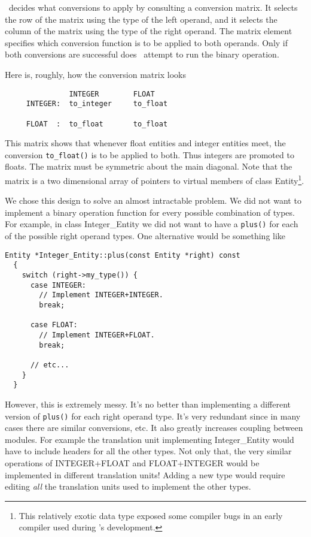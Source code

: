 \documentclass{report}
\begin{document}
\CLAC\ decides what conversions to apply by consulting a conversion matrix. It selects the row
of the matrix using the type of the left operand, and it selects the column of the matrix using
the type of the right operand. The matrix element specifies which conversion function is to be
applied to both operands. Only if both conversions are successful does \CLAC\ attempt to run the
binary operation.

Here is, roughly, how the conversion matrix looks

%
%
\begin{verbatim}
               INTEGER        FLOAT
     INTEGER:  to_integer     to_float

     FLOAT  :  to_float       to_float
\end{verbatim}

This matrix shows that whenever float entities and integer entities meet, the conversion
\texttt{to\_float()} is to be applied to both. Thus integers are promoted to floats. The matrix
must be symmetric about the main diagonal. Note that the matrix is a two dimensional array of
pointers to virtual members of class Entity\footnote{This relatively exotic data type exposed
  some compiler bugs in an early compiler used during \CLAC's development.}.

We chose this design to solve an almost intractable problem. We did not want to implement a
binary operation function for every possible combination of types. For example, in class
Integer\_Entity we did not want to have a \texttt{plus()} for each of the possible right operand
types. One alternative would be something like

\begin{verbatim}
Entity *Integer_Entity::plus(const Entity *right) const
  {
    switch (right->my_type()) {
      case INTEGER:
        // Implement INTEGER+INTEGER.
        break;

      case FLOAT:
        // Implement INTEGER+FLOAT.
        break;

      // etc...
    }
  }
\end{verbatim}

However, this is extremely messy. It's no better than implementing a different version of
\texttt{plus()} for each right operand type. It's very redundant since in many cases there are
similar conversions, etc. It also greatly increases coupling between modules. For example the
translation unit implementing Integer\_Entity would have to include headers for all the other
types. Not only that, the very similar operations of INTEGER+FLOAT and FLOAT+INTEGER would be
implemented in different translation units! Adding a new type would require editing \emph{all}
the translation units used to implement the other types.
\end{document}
